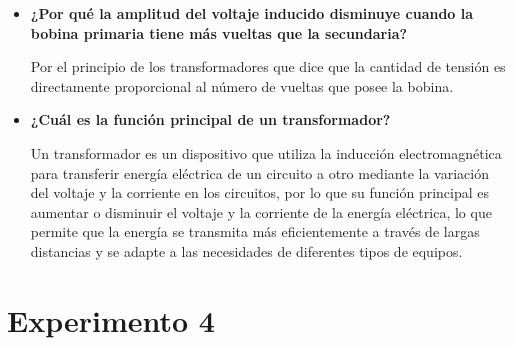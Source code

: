 \documentclass[letterpaper, 12pt]{report}
\begin{document}
\begin{itemize}[label=$\bullet$]
      \item \textbf{¿Por qué la amplitud del voltaje inducido disminuye cuando la bobina primaria tiene
                  más vueltas que la secundaria?}

            Por el principio de los transformadores que dice que la
            cantidad de tensión es directamente proporcional al número
            de vueltas que posee la bobina.

      \item \textbf{¿Cuál es la función principal de un transformador?}

            Un transformador es un dispositivo que utiliza la inducción
            electromagnética para transferir energía eléctrica de un
            circuito a otro mediante la variación del voltaje y la
            corriente en los circuitos, por lo que su función principal
            es aumentar o disminuir el voltaje y la corriente de la
            energía eléctrica, lo que permite que la energía se
            transmita más eficientemente a través de largas distancias
            y se adapte a las necesidades de diferentes tipos de
            equipos.
\end{itemize}

\section*{Experimento 4}
\end{document}
